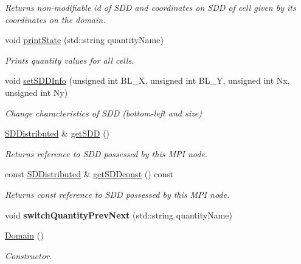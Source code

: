 \begin{DoxyCompactItemize}
\begin{DoxyCompactList}\small\item\em Returns non-\/modifiable id of S\+DD and coordinates on S\+DD of cell given by its coordinates on the domain. \end{DoxyCompactList}\item 
void \hyperlink{classDomain_a1163559d75540c4cd29c7aa775feca80}{print\+State} (std\+::string quantity\+Name)
\begin{DoxyCompactList}\small\item\em Prints quantity values for all cells. \end{DoxyCompactList}\item 
void \hyperlink{classDomain_acc1225a3c5e6e2a808c88d187adc7d3c}{set\+S\+D\+D\+Info} (unsigned int B\+L\+\_\+X, unsigned int B\+L\+\_\+Y, unsigned int Nx, unsigned int Ny)
\begin{DoxyCompactList}\small\item\em Change characteristics of S\+DD (bottom-\/left and size) \end{DoxyCompactList}\item 
\hyperlink{classSDDistributed}{S\+D\+Distributed} \& \hyperlink{classDomain_a26ceb37145bc70b3cc85e15e24a54287}{get\+S\+DD} ()
\begin{DoxyCompactList}\small\item\em Returns reference to S\+DD possessed by this M\+PI node. \end{DoxyCompactList}\item 
const \hyperlink{classSDDistributed}{S\+D\+Distributed} \& \hyperlink{classDomain_a8172470afa3d3ec4c7202c8ee25ab3b8}{get\+S\+D\+Dconst} () const
\begin{DoxyCompactList}\small\item\em Returns const reference to S\+DD possessed by this M\+PI node. \end{DoxyCompactList}\item 
\mbox{\label{classDomain_a9f12ce216ba0fdb5e46147875f9a97a3}} 
void {\bfseries switch\+Quantity\+Prev\+Next} (std\+::string quantity\+Name)
\item 
\mbox{\label{classDomain_a6adccae537e53d4fde2b70f875e6b8d0}} 
\hyperlink{classDomain_a6adccae537e53d4fde2b70f875e6b8d0}{Domain} ()
\begin{DoxyCompactList}\small\item\em Constructor. \end{DoxyCompactList}\item 

\end{DoxyCompactItemize}
